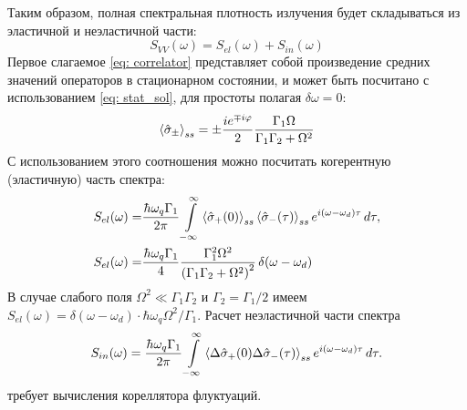 Таким образом, полная спектральная плотность излучения будет складываться из эластичной и неэластичной части:
\begin{equation}
S_{VV}(\omega) = S_{el}(\omega) + S_{in}(\omega)
\end{equation}
Первое слагаемое \eqref{eq: correlator} представляет собой произведение средних значений операторов в стационарном состоянии, и может быть посчитано с использованием \eqref{eq: stat_sol}, для простоты полагая $\delta\omega\!=\!0$:
\begin{equation}
\braket{\hat{\sigma}_\pm}_{ss} = \pm \frac{ie^{\mp i\varphi}}{2}\frac{\Gamma_1\Omega}{\Gamma_1\Gamma_2+\Omega^2}
\end{equation}
С использованием этого соотношения можно посчитать когерентную (эластичную) часть спектра:
\begin{align}
S_{el}(\omega) =& \frac{\hbar\omega_q
	\Gamma_1}{2\pi}\int\limits_{-\infty}^{\infty}\braket{\hat{\sigma}_{+}(0)}_{ss}\braket{\hat{\sigma}_{-}(\tau)}_{ss}e^{i(\omega-\omega_d) \tau}\,d\tau,\\
S_{el}(\omega) =& \frac{\hbar\omega_q\Gamma_1}{4}\frac{\Gamma_1^2\Omega^2}{\left(\Gamma_1\Gamma_2+\Omega^2\right)^2}\,\delta\!\left(\omega-\omega_d\right)
\end{align}
В случае слабого поля $\Omega^2\!\ll\!\Gamma_1\Gamma_2$ и $\Gamma_2\!=\!\Gamma_1/2$ имеем $S_{el}(\omega)\!=\!\delta\!\left(\omega-\omega_d\right)\cdot\hbar \omega_q\Omega^2/\Gamma_1$.  Расчет неэластичной части спектра 
\begin{equation}
S_{in}(\omega) = \frac{\hbar\omega_q
	\Gamma_1}{2\pi}\int\limits_{-\infty}^{\infty}\braket{\Delta\hat{\sigma}_{+}(0)\Delta\hat{\sigma}_{-}(\tau)}_{ss}e^{i(\omega-\omega_d) \tau}\,d\tau.
\label{eq: inelastic}
\end{equation}
требует вычисления кореллятора флуктуаций. 

